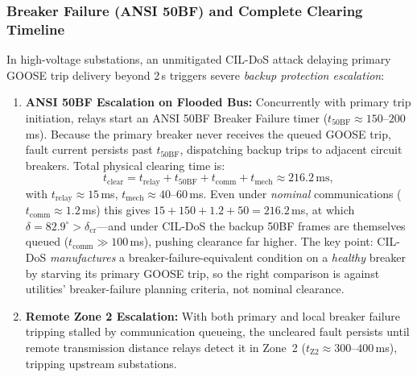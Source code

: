 \documentclass[journal]{IEEEtran}
\begin{document}
\subsubsection{Breaker Failure (ANSI 50BF) and Complete Clearing Timeline}
In high-voltage substations, an unmitigated CIL-DoS attack delaying primary GOOSE trip delivery beyond 2\,s triggers severe \emph{backup protection escalation}:
\begin{enumerate}[leftmargin=*,noitemsep,topsep=1pt]
    \item \textbf{ANSI 50BF Escalation on Flooded Bus:} Concurrently with primary trip initiation, relays start an ANSI 50BF Breaker Failure timer ($t_{\text{50BF}} \approx 150\text{--}200$\,ms). Because the primary breaker never receives the queued GOOSE trip, fault current persists past $t_{\text{50BF}}$, dispatching backup trips to adjacent circuit breakers. Total physical clearing time is:
    \begin{equation}
    t_{\text{clear}} = t_{\text{relay}} + t_{\text{50BF}} + t_{\text{comm}} + t_{\text{mech}} \approx 216.2\,\text{ms},
    \end{equation}
    with $t_{\text{relay}}\approx 15$\,ms, $t_{\text{mech}}\approx 40$--$60$\,ms. Even under \emph{nominal} communications ($t_{\text{comm}}\approx 1.2$\,ms) this gives $15+150+1.2+50=216.2$\,ms, at which $\delta=82.9^\circ>\delta_{\text{cr}}$---and under CIL-DoS the backup 50BF frames are themselves queued ($t_{\text{comm}}\gg 100$\,ms), pushing clearance far higher. The key point: CIL-DoS \emph{manufactures} a breaker-failure-equivalent condition on a \emph{healthy} breaker by starving its primary GOOSE trip, so the right comparison is against utilities' breaker-failure planning criteria, not nominal clearance.
    \item \textbf{Remote Zone 2 Escalation:} With both primary and local breaker failure tripping stalled by communication queueing, the uncleared fault persists until remote transmission distance relays detect it in Zone~2 ($t_{\text{Z2}} \approx 300\text{--}400$\,ms), tripping upstream substations.
\end{enumerate}
\end{document}
